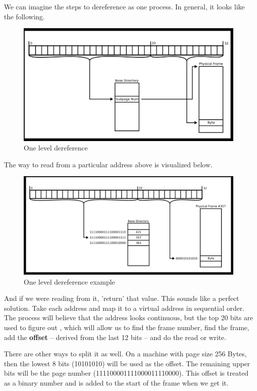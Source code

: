 We can imagine the steps to dereference as one process.
In general, it looks like the following.

\begin{figure}[H]
  \centering
  \includegraphics[width=1.0\textwidth]{ipc/drawings/level_split.eps}
  \caption{One level dereference}
\end{figure}

The way to read from a particular address above is visualized below.

\begin{figure}[H]
  \centering
  \includegraphics[width=1.0\textwidth]{ipc/drawings/level_split_filled.eps}
  \caption{One level dereference example}
\end{figure}

And if we were reading from it, 'return' that value.
This sounds like a perfect solution.
Take each address and map it to a virtual address in sequential order.
The process will believe that the address looks continuous, but the top 20 bits are used to figure out ,
which will allow us to find the frame number, find the frame, add the \textbf{offset} -- derived from the last 12 bits -- and do the read or write.

There are other ways to split it as well.
On a machine with page size 256 Bytes, then the lowest 8 bits (10101010) will be used as the offset.
The remaining upper bits will be the page number (111100001111000011110000). This offset is treated as a binary number and is added to the start of the frame when we get it.

